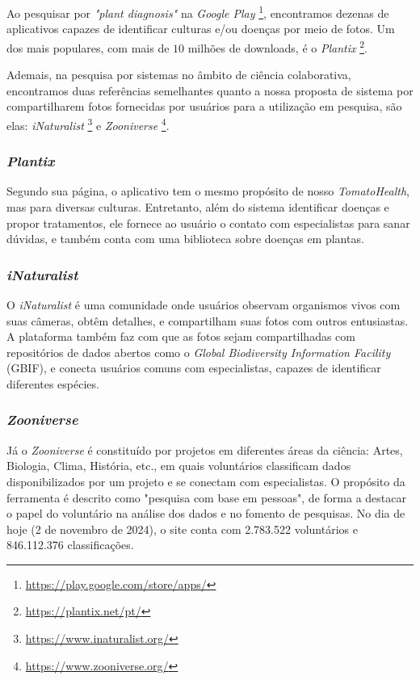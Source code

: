 Ao pesquisar por \textit{"plant diagnosis"} na \textit{Google Play} \footnote{\url{https://play.google.com/store/apps/}}, encontramos dezenas de aplicativos capazes de identificar culturas e/ou doenças por meio de fotos. Um dos mais populares, com mais de $10$ milhões de downloads, é o \textit{Plantix} \footnote{\url{https://plantix.net/pt/}}.

Ademais, na pesquisa por sistemas no âmbito de ciência colaborativa, encontramos duas referências semelhantes quanto a nossa proposta de sistema por compartilharem fotos fornecidas por usuários para a utilização em pesquisa, são elas: \textit{iNaturalist} \footnote{\url{https://www.inaturalist.org/}} e \textit{Zooniverse} \footnote{\url{https://www.zooniverse.org/}}.

\subsubsection{{\textit{Plantix}}}

Segundo sua página, o aplicativo tem o mesmo propósito de nosso \textit{TomatoHealth}, mas para diversas culturas. Entretanto, além do sistema identificar doenças e propor tratamentos, ele fornece ao usuário o contato com especialistas para sanar dúvidas, e também conta com uma biblioteca sobre doenças em plantas.

\subsubsection{{\textit{iNaturalist}}}

O \textit{iNaturalist} é uma comunidade onde usuários observam organismos vivos com suas câmeras, obtêm detalhes, e compartilham suas fotos com outros entusiastas. A plataforma também faz com que as fotos sejam compartilhadas com repositórios de dados abertos como o \textit{Global Biodiversity Information Facility} (GBIF), e conecta usuários comuns com especialistas, capazes de identificar diferentes espécies.

\subsubsection{{\textit{Zooniverse}}}

Já o \textit{Zooniverse} é constituído por projetos em diferentes áreas da ciência: Artes, Biologia, Clima, História, etc., em quais voluntários classificam dados disponibilizados por um projeto e se conectam com especialistas. O propósito da ferramenta é descrito como "pesquisa com base em pessoas", de forma a destacar o papel do voluntário na análise dos dados e no fomento de pesquisas. No dia de hoje (2 de novembro de 2024), o site conta com 2.783.522 voluntários e 846.112.376 classificações.
